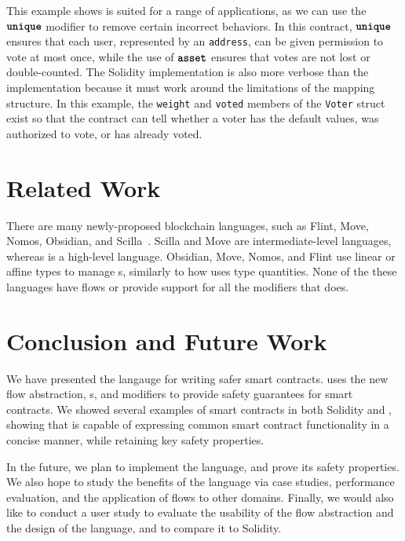 \documentclass[nonacm, dvipsnames, usenames, sigconf]{acmart}
\begin{document}
This example shows \langName is suited for a range of applications, as we can use the $\textbf{\texttt{unique}}$ modifier to remove certain incorrect behaviors.
In this contract, $\textbf{\texttt{unique}}$ ensures that each user, represented by an \lstinline{address}, can be given permission to vote at most once, while the use of $\textbf{\texttt{asset}}$ ensures that votes are not lost or double-counted.
The Solidity implementation is also more verbose than the \langName implementation because it must work around the limitations of the mapping structure.
In this example, the \lstinline{weight} and \lstinline{voted} members of the \lstinline{Voter} struct exist so that the contract can tell whether a voter has the default values, was authorized to vote, or has already voted.

\section{Related Work}
There are many newly-proposed blockchain languages, such as Flint, Move, Nomos, Obsidian, and Scilla~\cite{schrans2018flint, blackshear2019move, das2019nomos, coblenz2019obsidian, sergey2018scilla}.
Scilla and Move are intermediate-level languages, whereas \langName is a high-level language.
Obsidian, Move, Nomos, and Flint use linear or affine types to manage \assetTxt{}s, similarly to how \langName uses type quantities.
None of the these languages have flows or provide support for all the modifiers that \langName does.

\section{Conclusion and Future Work}

We have presented the \langName langauge for writing safer smart contracts.
\langName uses the new flow abstraction, \assetTxt{}s, and modifiers to provide safety guarantees for smart contracts.
We showed several examples of smart contracts in both Solidity and \langName, showing that \langName is capable of expressing common smart contract functionality in a concise manner, while retaining key safety properties.

In the future, we plan to implement the \langName language, and prove its safety properties.
We also hope to study the benefits of the language via case studies, performance evaluation, and the application of flows to other domains.
Finally, we would also like to conduct a user study to evaluate the usability of the flow abstraction and the design of the language, and to compare it to Solidity.



\end{document}
